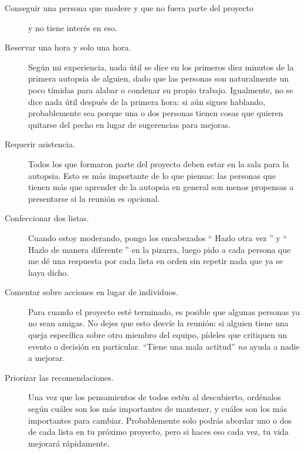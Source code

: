 \begin{description}

\item[Conseguir una persona que modere y que no fuera parte del proyecto]
  y no tiene interés en eso.

\item[Reservar una hora y solo una hora.]
  Según mi experiencia,
  nada útil se dice en los primeros diez minutos de la primera autopsia de alguien,
  dado que las personas son naturalmente un poco tímidas para alabar o condenar su propio trabajo.
  Igualmente,
  no se dice nada útil después de la primera hora:
  si aún sigues hablando,
  probablemente sea porque una o dos personas
  tienen cosas que quieren quitarse del pecho
  en lugar de sugerencias para mejoras.

\item[Requerir asistencia.]
  Todos los que formaron parte del proyecto deben estar en la sala para la autopsia.
  Esto es más importante de lo que piensas:
  las personas que tienen más que aprender de la autopsia
  en general son menos propensas a presentarse si la reunión es opcional.

\item[Confeccionar dos listas.]
  Cuando estoy moderando,
  pongo los encabezados `` Hazlo otra vez '' y `` Hazlo de manera diferente '' en la pizarra,
  luego pido a cada persona que me dé una respuesta por cada lista en orden 
  sin repetir nada que ya se haya dicho.

\item[Comentar sobre acciones en lugar de individuos.]
  Para cuando el proyecto esté terminado,
  es posible que algunas personas ya no sean amigas.
  No dejes que esto desvíe la reunión:
  si alguien tiene una queja específica sobre otro miembro del equipo,
  pídeles que critiquen un evento o decisión en particular.
  ``Tiene una mala actitud'' \emph{no} ayuda a nadie a mejorar.

\item[Priorizar las recomendaciones.]
  Una vez que los pensamientos de todos estén al descubierto,
  ordénalos según cuáles son los más importantes de mantener,
  y cuáles son los más importantes para cambiar.
  Probablemente solo podrás abordar uno o dos de cada lista en tu próximo proyecto,
  pero si haces eso cada vez,
  tu vida mejorará rápidamente.

\end{description}

